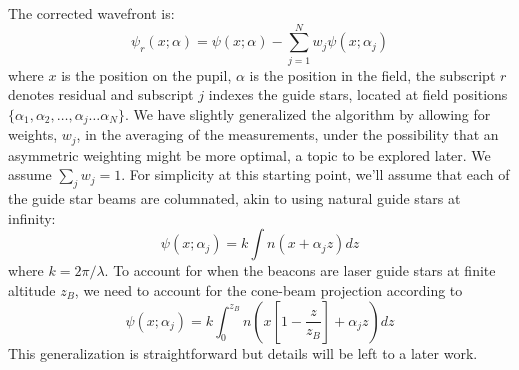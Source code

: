 \documentclass[11pt, oneside]{article}   	%
\begin{document}
The corrected wavefront is:
\begin{equation}
\label{eqn:residual_wf}
\psi_r(x; \alpha) = \psi(x;\alpha) - \sum_{j=1}^{N} w_j \psi(x;\alpha_j)
\end{equation}
where $x$ is the position on the pupil, $\alpha$ is the position in the field, the subscript $r$ denotes residual and subscript $j$ indexes the guide stars, located at field positions $\{\alpha_1, \alpha_2, \ldots, \alpha_j \ldots \alpha_N\}$. We have slightly generalized the algorithm by allowing for weights, $w_j$, in the averaging of the measurements, under the possibility that an asymmetric weighting might be more optimal, a topic to be explored later. We assume $\sum_j w_j = 1$. For simplicity at this starting point, we'll assume that each of the guide star beams are columnated, akin to using natural guide stars at infinity:
\begin{equation}
\label{eqn:off_axis_wfs}
\psi(x;\alpha_j) = k \int n(x + \alpha_j z) dz
\end{equation}
where $k = 2 \pi / \lambda$.  To account for when the beacons are laser guide stars at finite altitude $z_{B}$, we need to account for the cone-beam projection according to
\begin{equation}
\psi(x;\alpha_j) = k \int_0^{z_B} n \left(x  \left [1 - \frac{z}{z_B}\right] + \alpha_j z \right ) dz
\end{equation}
This generalization is straightforward but details will be left to a later work.
\end{document}
